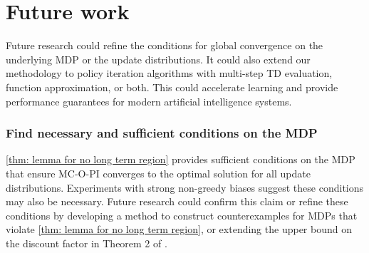 


\vspace{-0.2cm}

\section{Future work}
\vspace{-0.2cm}

Future research could refine the conditions for global convergence on the underlying MDP or the update distributions.
It could also extend our methodology to policy iteration algorithms with multi-step TD evaluation, function approximation, or both.
This could accelerate learning and provide performance guarantees for modern artificial intelligence systems.


\subsubsection{Find necessary and sufficient conditions on the MDP}
\vspace{-0.2cm}


\autoref{thm: lemma for no long term region} provides sufficient conditions on the MDP that ensure MC-O-PI converges to the optimal solution for all update distributions.
Experiments with strong non-greedy biases suggest these conditions may also be necessary.
Future research could confirm this claim or refine these conditions
by developing a method to construct counterexamples for MDPs that violate \autoref{thm: lemma for no long term region},
or extending the upper bound on the discount factor in Theorem 2 of \cite{Harutyunyan2016QCorrections}.

